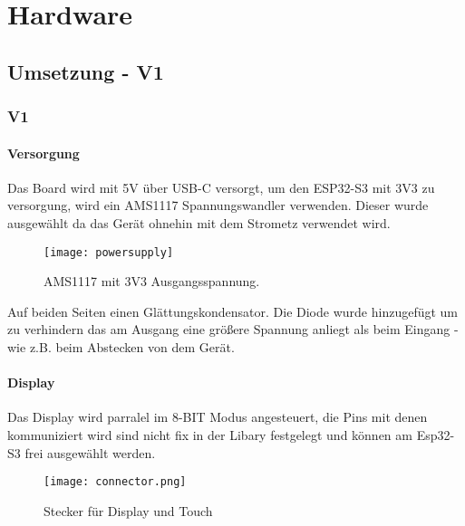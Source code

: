 \graphicspath{ {HW-PIC/} }


\chapter{Hardware}

    \section{Umsetzung - V1}
    
    \subsection{V1}
        \subsubsection{Versorgung}
        Das Board wird mit 5V über USB-C versorgt, um den ESP32-S3 mit 3V3 zu 
        versorgung, wird ein AMS1117 Spannungswandler verwenden. Dieser wurde ausgewählt
        da das Gerät ohnehin mit dem Strometz verwendet wird. 
            \begin{figure}[h]
                \centering
                \texttt{[image: powersupply]}
                \caption{AMS1117 mit 3V3 Ausgangsspannung.}
                \label{fig:sch1}
                
            \end{figure}

        Auf beiden Seiten einen Glättungskondensator. Die Diode wurde hinzugefügt um zu verhindern das am Ausgang eine größere Spannung
        anliegt als beim Eingang - wie z.B. beim Abstecken von dem Gerät.

        \newpage
        \subsubsection{Display}
        Das Display wird parralel im 8-BIT Modus angesteuert, die Pins mit denen 
        kommuniziert wird sind nicht fix in der Libary festgelegt und können am Esp32-S3 
        frei ausgewählt werden. 

            \begin{figure}[h!]
                \centering
                \texttt{[image: connector.png]}
                \caption{Stecker für Display und Touch}
                \label{fig:sch2}

            \end{figure}

